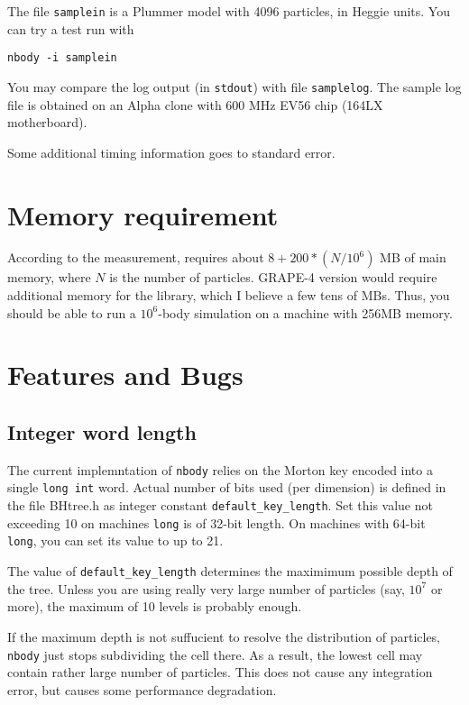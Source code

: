 The file {\tt samplein} is a Plummer model with 4096 particles, in
Heggie units.  You can try a test run with
\begin{verbatim}
nbody -i samplein
\end{verbatim}
You may compare the log output (in {\tt stdout}) with
file {\tt samplelog}. The sample log file is obtained on an Alpha
clone with 600 MHz EV56 chip (164LX motherboard).

Some additional timing information goes to standard error.

\section{Memory requirement}

According to the measurement, \nbody requires about $8+200*(N/10^6)$ MB of
main memory, where $N$ is the number of particles. GRAPE-4 version
would require additional memory for the library, which I believe a few 
tens of MBs. Thus, you should be able to run a $10^6$-body simulation
on a machine with 256MB memory. 

\section{Features and Bugs}

\subsection{Integer word length}

The current implemntation of {\tt nbody} relies on the Morton key
encoded into a single {\tt long int} word. Actual number of bits used
(per dimension) is defined in the file BHtree.h as integer constant
{\tt default\_key\_length}. Set this value not exceeding 10 on
machines {\tt long} is of 32-bit length. On machines with 64-bit {\tt
long}, you can set its value to up to 21.

The value of {\tt default\_key\_length} determines the maximimum
possible depth of the tree. Unless you are using really very large
number of particles (say, $10^7$ or more), the maximum of 10 levels is 
probably enough.

If the maximum depth is not suffucient to resolve the distribution of
particles, {\tt nbody} just stops subdividing the cell there. As a
result, the lowest cell may contain rather large number of
particles. This does not cause any integration error, but causes some
performance degradation.

